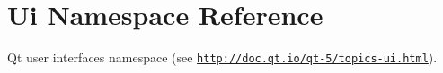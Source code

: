 \hypertarget{namespace_ui}{}\section{Ui Namespace Reference}
\label{namespace_ui}


Qt user interfaces namespace (see \href{http://doc.qt.io/qt-5/topics-ui.html}{\tt http\+://doc.\+qt.\+io/qt-\/5/topics-\/ui.\+html}).  


